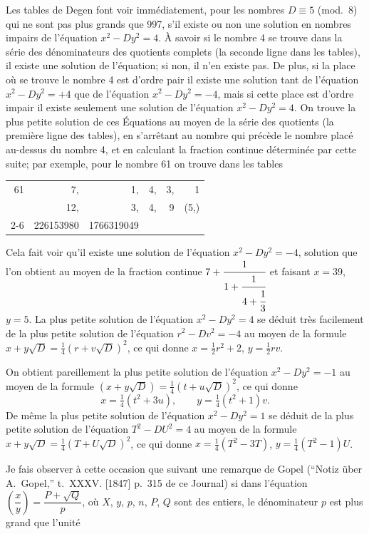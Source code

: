 \documentclass[11pt,a4paper]{book}
\theoremstyle{plain}
\begin{document}
Les tables de Degen font voir imm\'{e}diatement, pour les nombres $D\equiv5$ (mod.~8) qui ne sont pas plus grands que 997, s'il existe ou non une solution en nombres impairs de l'\'{e}quation $x^2-Dy^2=4$. \`{A} savoir si le nombre 4 se trouve dans la s\'{e}rie des d\'{e}nominateurs des quotients complets (la seconde ligne dans les tables), il existe une solution de l'\'{e}quation; si non, il n'en existe pas. De plus, si la place o\`{u} se trouve le nombre 4 est d'ordre pair il existe une solution tant de l'\'{e}quation $x^2-Dy^2=+4$ que de l'\'{e}quation $x^2-Dy^2=-4$, mais si cette place est d'ordre impair il existe seulement une solution de l'\'{e}quation $x^2-Dy^2=4$. On trouve la plus petite solution de ces \'{E}quations au moyen de la s\'{e}rie des quotients (la premi\`{e}re ligne des tables), en s'arr\^{e}tant au nombre qui pr\'{e}c\`{e}de le nombre plac\'{e} au-dessus du nombre 4, et en calculant la fraction continue d\'{e}termin\'{e}e par cette suite; par exemple, pour le nombre 61 on trouve dans les tables
\begin{center}
\begin{tabular}{r|rrrrr}
61 & 7, & 1, & 4, & 3, & 1\\
& 12, & 3, & 4, & 9 & (5,\;5)\\
\cline{2-6}
& 226153980 & 1766319049 & \multicolumn{3}{c}{}
\end{tabular}
\end{center}
Cela fait voir qu'il existe une solution de l'\'{e}quation $x^2-Dy^2=-4$, solution que l'on obtient au moyen de la fraction continue $7+\cfrac{1}{1+\cfrac{1}{4+\cfrac{1}{3}}}$ et faisant $x=39$, $y=5$. La plus petite solution de l'\'{e}quation $x^2-Dy^2=4$ se d\'{e}duit tr\`{e}s facilement de la plus petite solution de l'\'{e}quation $r^2-Dv^2=-4$ au moyen de la formule $x+y\sqrt{D}=\tfrac{1}{4}(r+v\sqrt{D})^2$, ce qui donne $x=\tfrac{1}{2}r^2+2$, $y=\tfrac{1}{2}rv$.

On obtient pareillement la plus petite solution de l'\'{e}quation $x^2-Dy^2=-1$ au moyen de la formule $(x+y\sqrt{D})=\tfrac{1}{4}(t+u\sqrt{D})^2$, ce qui donne
\[
x=\tfrac{1}{4}(t^2+3u),\qquad y=\tfrac{1}{4}(t^2+1)v.
\]
De m\^{e}me la plus petite solution de l'\'{e}quation $x^2-Dy^2=1$ se d\'{e}duit de la plus petite solution de l'\'{e}quation $T^2-DU^2=4$ au moyen de la formule $x+y\sqrt{D}=\tfrac{1}{4}(T+U\sqrt{D})^2$, ce qui donne $x=\tfrac{1}{4}(T^2-3T)$, $y=\tfrac{1}{4}(T^2-1)U$.

Je fais observer \`{a} cette occasion que suivant une remarque de Gopel (``Notiz \"{u}ber A.~Gopel,'' t.~XXXV. [1847] p.~315 de ce Journal) si dans l'\'{e}quation $\left(\dfrac{x}{y}\right)=\dfrac{P+\sqrt{Q}}{p}$, o\`{u} $X$, $y$, $p$, $n$, $P$, $Q$ sont des entiers, le d\'{e}nominateur $p$ est plus grand que l'unit\'{e}
\end{document}
